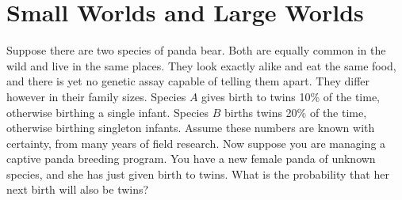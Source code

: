 \chapter{Small Worlds and Large Worlds}

\begin{exer}
Suppose there are two species of panda bear. Both are equally common in the 
wild and live in the same places. They look exactly alike and eat the same 
food, and there is yet no genetic assay capable of telling them apart. They 
differ however in their family sizes. Species $A$ gives birth to twins 10\% of 
the time, otherwise birthing a single infant. Species $B$ births twins 20\% of 
the time, otherwise birthing singleton infants. Assume these numbers are 
known with certainty, from many years of field research.
Now suppose you are managing a captive panda breeding program. You have a new 
female panda of unknown species, and she has just given birth to twins. What 
is the probability that her next birth will also be twins?
\end{exer}
